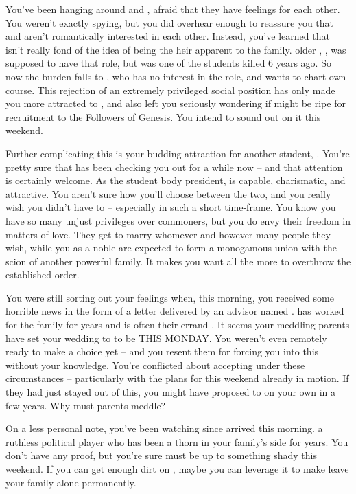 \documentclass[char]{GL2020}
\begin{document}
You've been hanging around \cHeir{} and \cAmbition{}, afraid that they have feelings for each other. You weren't exactly spying, but you did overhear enough to reassure you that \cAmbition{} and \cHeir{} aren't romantically interested in each other. Instead, you've learned that \cHeir{} isn't really fond of the idea of being the heir apparent to the \cHeir{\formal} family. \cHeir{\Their} older \cHeirSibling{\sibling}, \cHeirSibling{}, was supposed to have that role, but \cHeirSibling{} was one of the students killed 6 years ago. So now the burden falls to \cHeir{}, who has no interest in the role, and wants to chart \cHeir{\their} own course. This rejection of an extremely privileged social position has only made you more attracted to \cHeir{\them}, and also left you seriously wondering if \cHeir{\they} might be ripe for recruitment to the Followers of Genesis. You intend to sound \cHeir{\them} out on it this weekend.
 
Further complicating this is your budding attraction for another student, \cPresident{}. You're pretty sure that \cPresident{} has been checking you out for a while now -- and that attention is certainly welcome. As the student body president, \cPresident{} is capable, charismatic, and attractive. You aren't sure how you'll choose between the two, and you really wish you didn't have to -- especially in such a short time-frame. You know you have so many unjust privileges over commoners, but you do envy their freedom in matters of love. They get to marry whomever and however many people they wish, while you as a noble are expected to form a monogamous union with the scion of another powerful family. It makes you want all the more to overthrow the established order.
 
You were still sorting out your feelings when, this morning, you received some horrible news in the form of a letter delivered by an advisor named \cDiplomat{\full}. \cDiplomat{} has worked for the \cHeir{\formal} family for years and is often their errand \cDiplomat{\kid}. It seems your meddling parents have set your wedding to \cHeir{} to be THIS MONDAY. You weren't even remotely ready to make a choice yet -- and you resent them for forcing you into this without your knowledge. You're conflicted about accepting under these circumstances -- particularly with the \pGoaties{} plans for this weekend already in motion. If they had just stayed out of this, you might have proposed to \cHeir{} on your own in a few years. Why must parents meddle?
 
On a less personal note, you've been watching \cEvil{\full} since \cEvil{\they} arrived this morning. \cEvil{\Theyare} a ruthless political player who has been a thorn in your family's side for years. You don't have any proof, but you're sure \cEvil{\they} must be up to something shady this weekend. If you can get enough dirt on \cEvil{\them}, maybe you can leverage it to make \cEvil{\them} leave your family alone permanently. 
 
\end{document}
